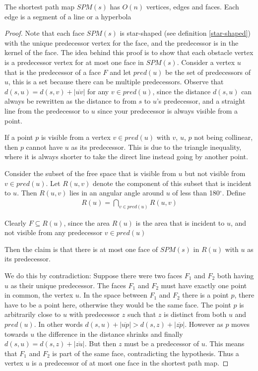 \begin{Lemma}[Lemma 3.2]
	\label{lemma:3.2}
	The shortest path map $SPM(s)$ has $O(n)$ vertices, edges and faces. Each
	edge is a segment of a line or a hyperbola
\end{Lemma}
\begin{proof}
	Note that each face $SPM(s)$ is star-shaped (see definition
	\ref{star-shaped})
	with the unique predecessor vertex for the face, and the predecessor is in
	the kernel of the face.
	The idea behind this proof is to show that each obstacle vertex is a
	predecessor vertex for at most one face in $SPM(s)$.
	Consider a vertex $u$ that is the predecessor of a face $F$ and let
	$pred(u)$ be the set of predecessors of $u$, this is a set because there can
	be multiple predecessors. Observe that $d(s,u)=d(s,v)+|\overline{uv}|$ for
	any $v\in pred(u)$, since the distance $d(s,u)$ can always be rewritten as
	the distance to from $s$ to $u$'s predecessor, and a straight line from the
	predecessor to $u$ since your predecessor is always visible from a point.

	If a point $p$ is visible from a vertex $v \in pred(u)$ with $v$, $u$, $p$ 
    not being collinear, then $p$ cannot have $u$ as its predecessor. This is 
    due to the triangle inequality, where it is always shorter to take the direct 
    line instead going by another point.


	Consider the subset of the free space that is visible from $u$
	but not visible from $v\in pred(u)$. Let $R(u,v)$ denote the component of
	this subset that is incident to $u$. Then $R(u,v)$ lies in an
	angular angle around $u$ of less than 180$^\circ$. Define
	\begin{align}
		R(u) =  \bigcap_{v\in pred(u)} R(u,v)
	\end{align}

	Clearly $F \subseteq R(u)$, since the area $R(u)$ is the area that is
	incident to $u$, and not visible from any predecessor $v\in pred(u)$ 
	
	Then the claim is that there is at most one face of
	$SPM(s)$ in $R(u)$ with $u$ as its predecessor. 
	
	We do this by contradiction: 
	Suppose there were two faces
	$F_1$ and $F_2$ both having $u$ as their unique predecessor. The faces $F_1$
	and $F_2$ must have exactly one point in common, the vertex $u$. In the space
	between $F_1$ and $F_2$ there is a point $p$, there have to be a point here,
	otherwise they would be the same face. The point $p$ is arbitrarily close to $u$ with
	predecessor $z$ such that $z$ is distinct from both $u$ and $pred(u)$. In
	other words $d(s,u)+|\overline{up}|>d(s,z)+|\overline{zp}|$. However as $p$
	moves towards $u$ the difference in the distance shrinks and finally
	$d(s,u) = d(s,z)+|\overline{zu}|$. But then $z$ must be a predecessor of
	$u$. This means that $F_1$ and $F_2$ is part of the same face, contradicting
	the hypothesis. Thus a vertex $u$ is a predecessor of at most one face in
	the shortest path map.


\end{proof}
